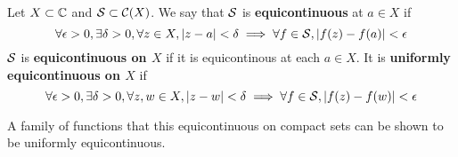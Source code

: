 \documentclass{article}
\begin{document}
\begin{definition}
Let \(X \subset \mathbb{C}\) and \(\mathcal{S} \subset \mathcal{C}(X)\). We say that \(\mathcal{S}\) is \textbf{equicontinuous} at \(a \in X\) if
\begin{equation}\forall \epsilon > 0, \exists \delta > 0, \forall z \in X, |z - a| < \delta \implies \forall f \in \mathcal{S}, |f(z) - f(a)| < \epsilon\end{equation}
\(\mathcal{S}\) is \textbf{equicontinuous on \(X\)} if it is equicontinous at each \(a \in X\). It is \textbf{uniformly equicontinuous on \(X\)} if
\begin{equation}\forall \epsilon > 0, \exists \delta > 0, \forall z, w \in X, |z - w| <\delta \implies \forall f \in \mathcal{S}, |f(z) - f(w)| < \epsilon\end{equation}
\end{definition}
A family of functions that this equicontinuous on compact sets can be shown to be uniformly equicontinuous.
\end{document}
